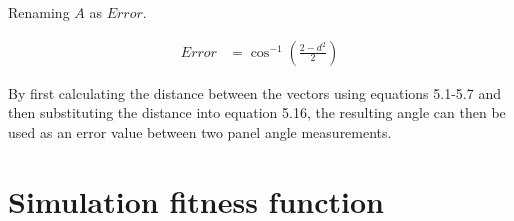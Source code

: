 \noindent Renaming $A$ as $Error$.

\begin{align}
	Error &= \cos^{-1}(\frac{2-d^2}{2}) \label{errorangle}
\end{align}


\noindent By first calculating the distance between the vectors using equations 5.1-5.7 and then substituting the distance into equation 5.16, the resulting angle can then be used as an error value between two panel angle measurements. %




\vspace{5mm}





\newpage
\section{Simulation fitness function}
\label{section_simulation_error_function}

